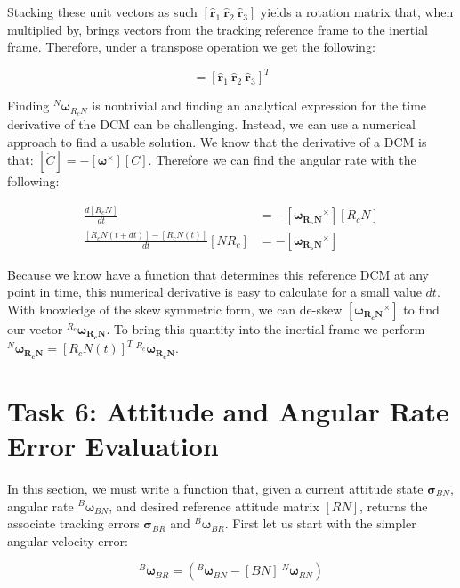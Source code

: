 \documentclass[paper]{aiaaNew}
\begin{document}
Stacking these unit vectors as such $[\hat{\bm{r}}_1 \ \hat{\bm{r}}_2 \ \hat{\bm{r}}_3 ]$ yields a rotation matrix that, when multiplied by, brings vectors from the tracking reference frame to the inertial frame. Therefore, under a transpose operation we get the following: 

\begin{equation}
  [R_cN] = [\hat{\bm{r}}_1 \ \hat{\bm{r}}_2 \ \hat{\bm{r}}_3 ]^T
\end{equation}

Finding $^N\bm{\omega}_{R_cN}$ is nontrivial and finding an analytical expression for the time derivative of the DCM can be challenging. Instead, we can use a numerical approach to find a usable solution. We know that the derivative of a DCM is that: $[\dot{C}] = -[\bm{\omega}^\times][C]$. Therefore we can find the angular rate with the following:



\begin{align}
  \frac{d[R_cN]}{dt} &= -[\bm{\omega_{R_cN}}^\times][R_cN] \\
  \frac{[R_cN(t+dt)] - [R_cN(t)]}{dt} [NR_c] &= -[\bm{\omega_{R_cN}}^\times]
\end{align}

Because we know have a function that determines this reference DCM at any point in time, this numerical derivative is easy to calculate for a small value $dt$. With knowledge of the skew symmetric form, we can de-skew $[\bm{\omega_{R_cN}}^\times]$ to find our vector  $^{R_c}\bm{\omega_{R_cN}}$. To bring this quantity into the inertial frame we perform $^{N}\bm{\omega_{R_cN}} = [R_cN(t)]^T \ ^{R_c}\bm{\omega_{R_cN}}$.






\section*{Task 6: Attitude and Angular Rate Error Evaluation}
In this section, we must write a function that, given a current attitude state $\bm{\sigma}_{BN}$, angular rate $^B\bm{\omega}_{BN}$, and desired reference attitude matrix $[RN]$, returns the associate tracking errors $\bm{\sigma}_{BR}$ and $^B\bm{\omega}_{BR}$. First let us start with the simpler angular velocity error:

\begin{equation}
  ^B\bm{\omega}_{BR} = (^B\bm{\omega}_{BN} - [BN] \ ^N\bm{\omega}_{RN})
\end{equation}
\end{document}
